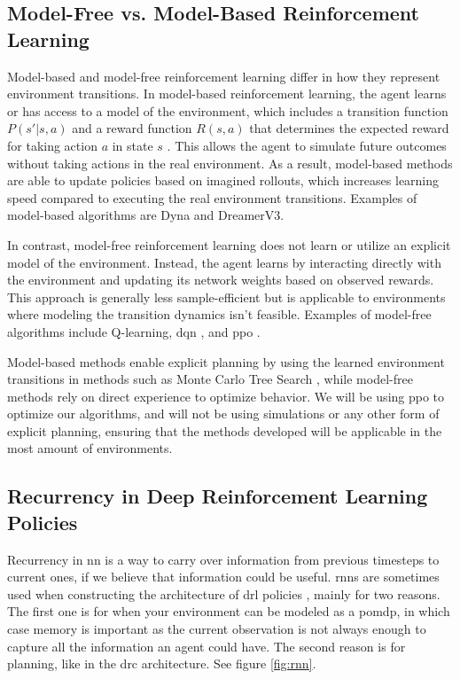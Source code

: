 \documentclass[UKenglish]{uiomasterthesis}
\begin{document}
\subsection{Model-Free vs. Model-Based Reinforcement Learning}
Model-based and model-free reinforcement learning differ in how they represent environment transitions. In model-based reinforcement learning, the agent learns or has access to a model of the environment, which includes a transition function \( P(s' | s, a) \) and a reward function \( R(s, a) \) that determines the expected reward for taking action \( a \) in state \( s \) \cite{moerland2022modelbasedreinforcementlearningsurvey}. This allows the agent to simulate future outcomes without taking actions in the real environment. As a result, model-based methods are able to update policies based on imagined rollouts, which increases learning speed compared to executing the real environment transitions. Examples of model-based algorithms are Dyna\cite{10.1145/122344.122377} and DreamerV3\cite{hafner2024masteringdiversedomainsworld}.

In contrast, model-free reinforcement learning does not learn or utilize an explicit model of the environment. Instead, the agent learns by interacting directly with the environment and updating its network weights based on observed rewards. This approach is generally less sample-efficient but is applicable to environments where modeling the transition dynamics isn't feasible. Examples of model-free algorithms include Q-learning, \ac{dqn} \cite{mnih2013playingatarideepreinforcement}, and \ac{ppo} \cite{schulman2017proximalpolicyoptimizationalgorithms}.

Model-based methods enable explicit planning by using the learned environment transitions in methods such as Monte Carlo Tree Search \cite{_wiechowski_2022}, while model-free methods rely on direct experience to optimize behavior. We will be using \ac{ppo} to optimize our algorithms, and will not be using simulations or any other form of explicit planning, ensuring that the methods developed will be applicable in the most amount of environments.

\subsection{Recurrency in Deep Reinforcement Learning Policies}
Recurrency in \ac{nn} is a way to carry over information from previous timesteps to current ones, if we believe that information could be useful. \acp{rnn} are sometimes used when constructing the architecture of \ac{drl} policies \cite{hausknecht2017deeprecurrentqlearningpartially}, mainly for two reasons. The first one is for when your environment can be modeled as a \ac{pomdp}, in which case memory is important as the current observation is not always enough to capture all the information an agent could have. The second reason is for planning, like in the \ac{drc} architecture\cite{guez2019investigationmodelfreeplanning}. See figure \ref{fig:rnn}.
\end{document}
